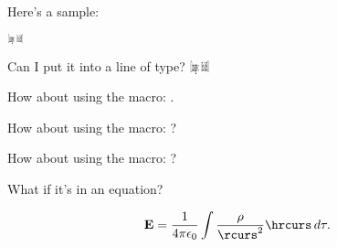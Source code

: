 \documentclass{report}
\begin{document}
Here's a sample:

$\resizebox{.16in}{.08in}{\texttt{[image: BoldR]}}$

Can I put it into a line of type?  $\resizebox{.21in}{.11in}{\texttt{[image: BoldR]}}$

How about using the macro: \brcurs.

How about using the macro: \rcurs?

How about using the macro: \hrcurs?

What if it's in an equation?

\begin{equation}
{\bf E} = {1\over 4\pi\epsilon_0}\int {\rho\over \rcurs^2}{\hrcurs}\,d\tau.
\end{equation}
\end{document}
